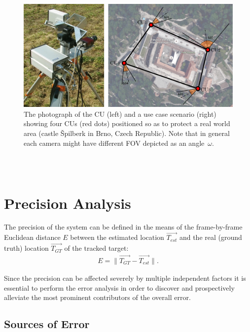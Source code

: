 \begin{figure}[htb]\centering
	\centering
	\includegraphics[width=0.75\linewidth]{fig/cu_and_spilberk_camera_units.pdf}
	\caption{The photograph of the CU (left) and a use case scenario (right) showing four CUs (red dots) positioned so as to protect a real world area (castle Špilberk in Brno, Czech Republic). Note that in general each camera might have different FOV depicted as an angle~$\omega$.}
	\label{fig:cu_and_topology}
\end{figure}

~\\
~\\
\section{Precision Analysis} \label{txt:precision_analysis}

The precision of the system can be defined in the means of the frame-by-frame Euclidean distance $E$ between the estimated location $\vec{T_{est}}$ and the real (ground truth) location $\vec{T_{GT}}$ of the tracked target:
\begin{align}
	E = \lVert \vec{T_{GT}} - \vec{T_{est}} \rVert.
\end{align}

Since the precision can be affected severely by multiple independent factors it is essential to perform the error analysis in order to discover and prospectively alleviate the most prominent contributors of the overall error.

\subsection{Sources of Error}

